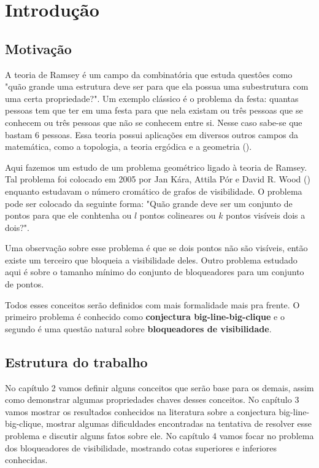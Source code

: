 \chapter{Introdução}
\label{cap:introducao}

\section{Motivação}
A teoria de Ramsey é um campo da combinatória que estuda questôes como "quão grande uma estrutura deve ser para que ela possua uma subestrutura com uma certa propriedade?". Um exemplo clássico é o problema da festa: quantas pessoas tem que ter em uma festa para que nela existam ou três pessoas que se conhecem ou três pessoas que não se conhecem entre si. Nesse caso sabe-se que bastam 6 pessoas. Essa teoria possui aplicações em diversos outros campos da matemática, como a topologia, a teoria ergódica e a geometria (\cite{ES}).

Aqui fazemos um estudo de um problema geométrico ligado à teoria de Ramsey. Tal problema foi colocado em 2005 por Jan Kára, Attila Pór e David R. Wood (\cite{visibilitygraph}) enquanto estudavam o número cromático de grafos de visibilidade. O problema pode ser colocado da seguinte forma: "Quão grande deve ser um conjunto de pontos para que ele conhtenha ou $l$ pontos colineares ou $k$ pontos visíveis dois a dois?".

Uma observação sobre esse problema é que se dois pontos não são visíveis, então existe um terceiro que bloqueia a visibilidade deles. Outro problema estudado aqui é sobre o tamanho mínimo do conjunto de bloqueadores para um conjunto de pontos.

Todos esses conceitos serão definidos com mais formalidade mais pra frente. O primeiro problema é conhecido como \textbf{conjectura big-line-big-clique} e o segundo é uma questão natural sobre \textbf{bloqueadores de visibilidade}.

\section{Estrutura do trabalho}
No capítulo 2 vamos definir alguns conceitos que serão base para os demais, assim como demonstrar algumas propriedades chaves desses conceitos. No capítulo 3 vamos mostrar os resultados conhecidos na literatura sobre a conjectura big-line-big-clique, mostrar algumas dificuldades encontradas na tentativa de resolver esse problema e discutir alguns fatos sobre ele. No capítulo 4 vamos focar no problema dos bloqueadores de visibilidade, mostrando cotas superiores e inferiores conhecidas.

